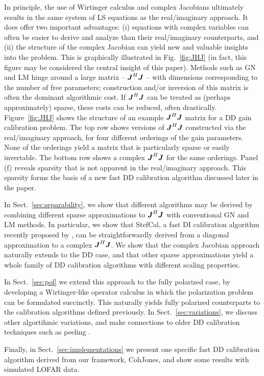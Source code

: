 \documentclass[useAMS,usenatbib]{mn2e}
\newcommand{\mat}[1]{{\bmath{#1}}}
\newcommand{\JJ}{\mat{J}} %
\newcommand{\JHJ}{\JJ^H\JJ} %
\newcommand{\COH}{{\sc CohJones}}
\newcommand{\StefCal}{{\sc StefCal}}
\begin{document}
In principle, the use of Wirtinger calculus and complex Jacobians ultimately results in the same system of LS 
equations as the real/imaginary approach. It does offer two important advantages: (i) equations with complex variables 
can often be easier to derive and analyze than their real/imaginary counterparts, and (ii) the structure of the
complex Jacobian can yield new and valuable insights into the problem. This is graphically illustrated in 
Fig.~\ref{fig:JHJ} (in fact, this figure may be considered the central insight of this paper). Methods such as 
GN and LM hinge around a large matrix -- $\JHJ$ -- with dimensions corresponding to the number of 
free parameters; construction and/or inversion of this matrix is often the dominant algorithmic cost. If $\JHJ$ can
be treated as (perhaps approximately) sparse, these costs can be reduced, often drastically. Figure~\ref{fig:JHJ} 
shows the structure of an example $\JHJ$ matrix for a DD gain calibration problem. The top row shows versions of
$\JHJ$ constructed via the real/imaginary approach, for four different orderings of the gain parameters. None of
the orderings yield a matrix that is particularly sparse or easily invertable. The bottom row shows a 
complex $\JHJ$ for the same orderings. Panel (f) reveals sparsity that is not apparent in the real/imaginary 
approach. This sparsity forms the basis of a new fast DD calibration algorithm discussed later in the paper.

In Sect.~\ref{sec:separability}, we show that different algorithms may be derived by combining 
different sparse approximations to $\JHJ$ with conventional GN and LM methods.  In particular, we show 
that \StefCal, a fast DI calibration algorithm recently proposed by \citet{Stefcal},
can be straightforwardly derived from a diagonal approximation to a complex $\JHJ$. We show that the 
complex Jacobian approach naturally extends to the DD case, and that other sparse approximations yield a whole family
of DD calibration algorithms with different scaling properties.

In Sect.~\ref{sec:pol} we extend this approach to the fully polarized case, by developing a Wirtinger-like 
operator calculus in which the polarization problem can be formulated succinctly. This naturally yields 
fully polarized counterparts to the calibration algorithms defined previously. In Sect.~\ref{sec:variations}, 
we discuss other algortihmic variations, and make connections to older DD calibration techniques such as 
peeling \citep{JEN:peeling}. 

Finally, in Sect.~\ref{sec:implementations} we present one specific fast DD calibration algorithm derived from
our framework, \COH, and show some results with simulated LOFAR data.
\end{document}
